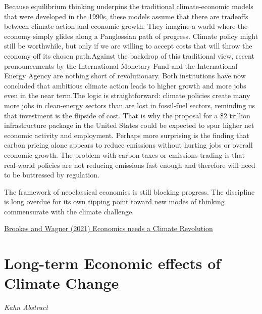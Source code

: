 \documentclass[
]{book}
\begin{document}
Because equilibrium thinking underpins the traditional climate-economic models that were developed in the 1990s, these models assume that there are tradeoffs between climate action and economic growth. They imagine a world where the economy simply glides along a Panglossian path of progress. Climate policy might still be worthwhile, but only if we are willing to accept costs that will throw the economy off its chosen path.Against the backdrop of this traditional view, recent pronouncements by the International Monetary Fund and the International Energy Agency are nothing short of revolutionary. Both institutions have now concluded that ambitious climate action leads to higher growth and more jobs even in the near term.The logic is straightforward: climate policies create many more jobs in clean-energy sectors than are lost in fossil-fuel sectors, reminding us that investment is the flipside of cost. That is why the proposal for a \$2 trillion infrastructure package in the United States could be expected to spur higher net economic activity and employment. Perhaps more surprising is the finding that carbon pricing alone appears to reduce emissions without hurting jobs or overall economic growth. The problem with carbon taxes or emissions trading is that real-world policies are not reducing emissions fast enough and therefore will need to be buttressed by regulation.

The framework of neoclassical economics is still blocking progress. The discipline is long overdue for its own tipping point toward new modes of thinking commensurate with the climate challenge.

\href{https://www.project-syndicate.org/commentary/neoclassical-economics-fails-with-climate-change-by-tom-brookes-and-gernot-wagner-2021-06}{Brookes and Wagner (2021) Economics needs a Climate Revolution}

\hypertarget{long-term-economic-effects-of-climate-change}{%
\section{Long-term Economic effects of Climate Change}\label{long-term-economic-effects-of-climate-change}}

\emph{Kahn Abstract}
\end{document}
